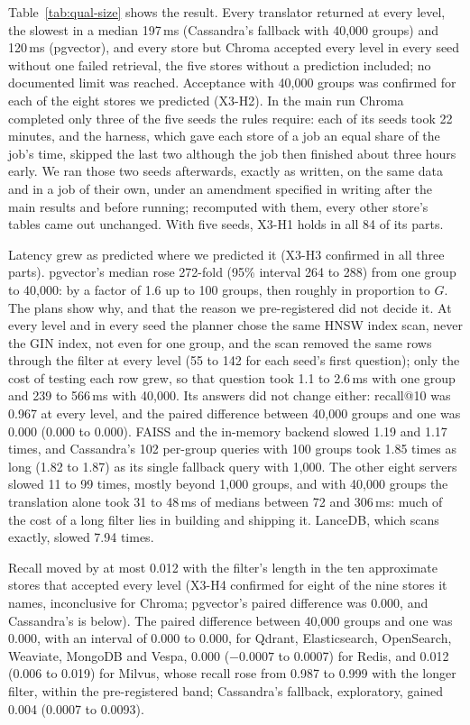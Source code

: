 Table~\ref{tab:qual-size} shows the result. Every translator returned at every level, the slowest
in a median 197\,ms (Cassandra's fallback with 40,000 groups) and 120\,ms (pgvector), and every store
but Chroma accepted every level in every seed without one failed retrieval, the five stores without a
prediction included; no documented limit was reached. Acceptance with 40,000 groups was confirmed for
each of the eight stores we predicted (X3-H2). In the main run Chroma completed only three of the five
seeds the rules require: each of its seeds took 22 minutes, and the harness, which gave each store of
a job an equal share of the job's time, skipped the last two although the job then finished about
three hours early. We ran those two seeds afterwards, exactly as written, on the same data and in a
job of their own, under an amendment specified in writing after the main results and before running;
recomputed with them, every other store's tables came out unchanged. With five seeds, X3-H1 holds in
all 84 of its parts.

Latency grew as predicted where we predicted it (X3-H3 confirmed in all three parts). pgvector's
median rose 272-fold (95\% interval 264 to 288) from one group to 40,000: by a factor of 1.6 up to
100 groups, then roughly in proportion to $G$. The plans show why, and that the reason we
pre-registered did not decide it. At every level and in every seed the planner chose the same HNSW
index scan, never the GIN index, not even for one group, and the scan removed the same rows through
the filter at every level (55 to 142 for each seed's first question); only the cost of testing each
row grew, so that question took 1.1 to 2.6\,ms with one group and 239 to 566\,ms with 40,000. Its
answers did not change either: recall@10 was 0.967 at every level, and the paired difference between
40,000 groups and one was 0.000 (0.000 to 0.000). FAISS and the in-memory backend slowed 1.19 and 1.17 times, and Cassandra's
102 per-group queries with 100 groups took 1.85 times as long (1.82 to 1.87) as its single fallback
query with 1,000. The other eight servers slowed 11 to 99 times, mostly beyond 1,000 groups, and with
40,000 groups the translation alone took 31 to 48\,ms of medians between 72 and 306\,ms: much of the
cost of a long filter lies in building and shipping it. LanceDB, which scans exactly, slowed 7.94
times.

Recall moved by at most 0.012 with the filter's length in the ten approximate stores that accepted every level
(X3-H4 confirmed for eight of the nine stores it names, inconclusive for Chroma; pgvector's paired difference was 0.000, and Cassandra's is below). The paired difference between 40,000 groups and one was 0.000,
with an interval of 0.000 to 0.000, for Qdrant, Elasticsearch, OpenSearch, Weaviate, MongoDB and
Vespa, 0.000 ($-0.0007$ to 0.0007) for Redis, and 0.012 (0.006 to 0.019) for Milvus, whose recall rose
from 0.987 to 0.999 with the longer filter, within the pre-registered band; Cassandra's fallback,
exploratory, gained 0.004 (0.0007 to 0.0093).


